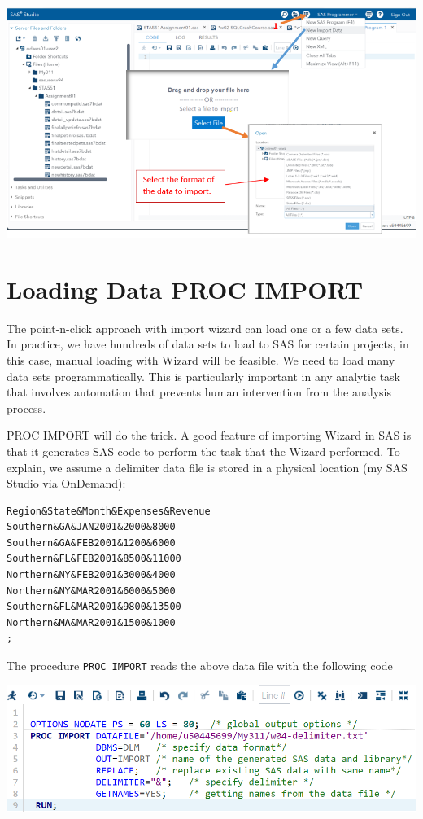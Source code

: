 \documentclass[
]{book}
\begin{document}
\begin{center}\includegraphics[width=1\linewidth]{img04/w04-SASstudioWizardGUI} \end{center}

\hypertarget{loading-data-proc-import}{%
\section{Loading Data PROC IMPORT}\label{loading-data-proc-import}}

The point-n-click approach with import wizard can load one or a few data sets. In practice, we have hundreds of data sets to load to SAS for certain projects, in this case, manual loading with Wizard will be feasible. We need to load many data sets programmatically. This is particularly important in any analytic task that involves automation that prevents human intervention from the analysis process.

PROC IMPORT will do the trick. A good feature of importing Wizard in SAS is that it generates SAS code to perform the task that the Wizard performed. To explain, we assume a delimiter data file is stored in a physical location (my SAS Studio via OnDemand):

\begin{verbatim}
Region&State&Month&Expenses&Revenue
Southern&GA&JAN2001&2000&8000
Southern&GA&FEB2001&1200&6000
Southern&FL&FEB2001&8500&11000
Northern&NY&FEB2001&3000&4000
Northern&NY&MAR2001&6000&5000
Southern&FL&MAR2001&9800&13500
Northern&MA&MAR2001&1500&1000
;
\end{verbatim}

The procedure \texttt{PROC\ IMPORT} reads the above data file with the following code

\begin{center}\includegraphics[width=1\linewidth]{img04/w04-ProcImport} \end{center}
\end{document}
